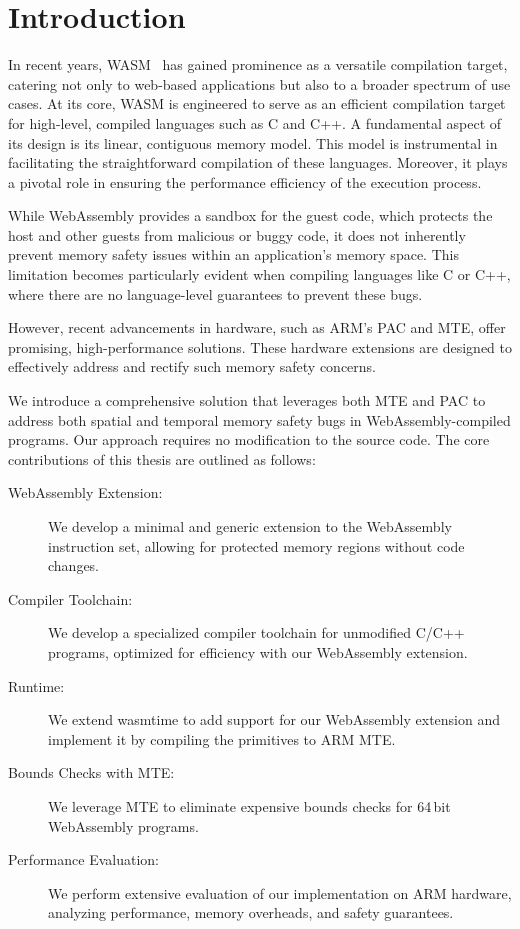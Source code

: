 \chapter{Introduction}
\label{ch:intro}

In recent years, \ac{WASM}~\cite{haas2017bringing} has gained prominence as a versatile compilation target, catering not only to web-based applications but also to a broader spectrum of use cases.
At its core, \ac{WASM} is engineered to serve as an efficient compilation target for high-level, compiled languages such as C and C++.
A fundamental aspect of its design is its linear, contiguous memory model.
This model is instrumental in facilitating the straightforward compilation of these languages.
Moreover, it plays a pivotal role in ensuring the performance efficiency of the execution process.

While WebAssembly provides a sandbox for the guest code, which protects the host and other guests from malicious or buggy code, it does not inherently prevent memory safety issues within an application's memory space.
This limitation becomes particularly evident when compiling languages like C or C++, where there are no language-level guarantees to prevent these bugs.

However, recent advancements in hardware, such as ARM's \ac{PAC} and \ac{MTE}, offer promising, high-performance solutions.
These hardware extensions are designed to effectively address and rectify such memory safety concerns.

We introduce a comprehensive solution that leverages both \ac{MTE} and \ac{PAC} to address both spatial and temporal memory safety bugs in WebAssembly-compiled programs.
Our approach requires no modification to the source code.
The core contributions of this thesis are outlined as follows:

\begin{description}
    \item[WebAssembly Extension:] We develop a minimal and generic extension to the WebAssembly instruction set, allowing for protected memory regions without code changes.
    \item[Compiler Toolchain:] We develop a specialized compiler toolchain for unmodified C/C++ programs, optimized for efficiency with our WebAssembly extension.
    \item[Runtime:] We extend wasmtime to add support for our WebAssembly extension and implement it by compiling the primitives to ARM \ac{MTE}.
    \item[Bounds Checks with \ac{MTE}:] We leverage \ac{MTE} to eliminate expensive bounds checks for 64\,bit WebAssembly programs.
    \item[Performance Evaluation:] We perform extensive evaluation of our implementation on ARM hardware, analyzing performance, memory overheads, and safety guarantees.
\end{description}
